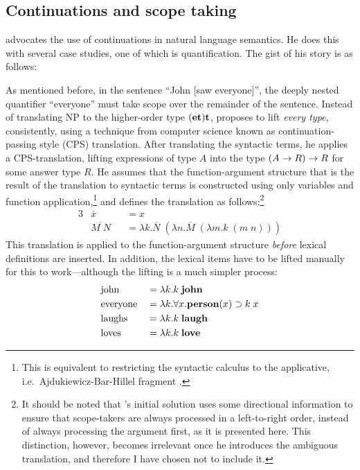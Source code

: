 \subsection{Continuations and scope taking}
\label{sec:continuations-and-scope-taking}
\citet{barker2002,barker2004} advocates the use of continuations in
natural language semantics. He does this with several case studies,
one of which is quantification. The gist of his story is as follows:

As mentioned before, in the sentence ``John [saw everyone]'', the
deeply nested quantifier ``everyone'' must take scope over the
remainder of the sentence. Instead of translating NP to the higher-order
type $(\mathbf{e}\mathbf{t})\mathbf{t}$, \citeauthor{barker2002} proposes to lift \emph{every
  type}, consistently, using a technique from computer science known
as continuation-passing style (CPS) translation. After translating the
syntactic terms, he applies a CPS-translation, lifting expressions of
type $A$ into the type $(A\rightarrow R)\rightarrow R$ for some answer type $R$. He
assumes that the function-argument structure that is the result of
the translation to syntactic terms is constructed using only variables
and function application,\footnote{%
  This is equivalent to restricting the syntactic calculus to the
  applicative, i.e.\ Ajdukiewicz-Bar-Hillel fragment
  \citep[see][ch.\ 1.1-1.5, AB-grammars]{moot2012}.
}
and defines the translation as follows:\footnote{%
  It should be noted that \citeauthor{barker2004}'s initial solution
  uses some directional information to ensure that scope-takers are
  always processed in a left-to-right order, instead of always
  processing the argument first, as it is presented here.
  This distinction, however, becomes irrelevant once he introduces the
  ambiguous translation, and therefore I have chosen not to include it.
}
\begin{alignat*}{3}
  &\overline{x}    &&= x\\
  &\overline{M\;N} &&= \lambda k. \overline{N}\;(\lambda n.\overline{M}\;(\lambda m.k\;(m\;n)))
\end{alignat*}
This translation is applied to the function-argument structure
\emph{before} lexical definitions are inserted.
In addition, the lexical items have to be lifted manually for this to
work---although the lifting is a much simpler process:
\begin{alignat*}{3}
  &\text{john}     &&= \lambda k. k\;\mathbf{john}                          \\
  &\text{everyone} &&= \lambda k. \forall x. \mathbf{person}(x)\supset k\;x \\
  &\text{laughs}   &&= \lambda k. k\;\mathbf{laugh}                         \\
  &\text{loves}    &&= \lambda k. k\;\mathbf{love}
\end{alignat*}
